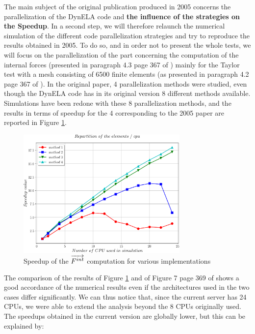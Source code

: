 The main subject of the original publication produced in 2005 concerns the parallelization of the DynELA code and \textbf{the influence of the strategies on the Speedup}. In a second step, we will therefore relaunch the numerical simulation of the different code parallelization strategies and try to reproduce the results obtained in 2005. To do so, and in order not to present the whole tests, we will focus on the parallelization of the part concerning the computation of the internal forces (presented in paragraph 4.3 page 367 of \cite{Pantale:2005}) mainly for the Taylor test with a mesh consisting of 6500 finite elements (as presented in paragraph 4.2 page 367 of \cite{Pantale:2005}). In the original paper, 4 parallelization methods were studied, even though the DynELA code has in its original version 8 different methods available. Simulations have been redone with these 8 parallelization methods, and the results in terms of speedup for the 4 corresponding to the 2005 paper are reported in Figure \ref{speedup}.
\begin{figure}[h!] 
  \centering
  \includegraphics[width=0.75\textwidth]{./speedup.pdf}
  \caption{Speedup of the $\protect\overrightarrow{F^{int}}$ computation for various implementations}
  \label{speedup}
\end{figure}
The comparison of the results of Figure \ref{speedup} and of Figure 7 page 369 of \cite{Pantale:2005} shows a good accordance of the numerical results even if the architectures used in the two cases differ significantly. We can thus notice that, since the current server has 24 CPUs, we were able to extend the analysis beyond the 8 CPUs originally used. The speedups obtained in the current version are globally lower, but this can be explained by:
